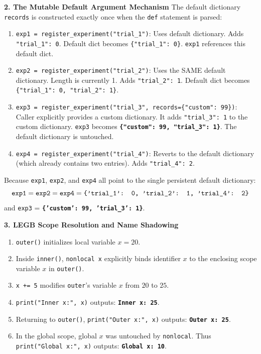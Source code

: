 \textbf{2. The Mutable Default Argument Mechanism}
The default dictionary \texttt{records} is constructed exactly once when the \texttt{def} statement is parsed:
\begin{enumerate}
    \item \texttt{exp1 = register\_experiment("trial\_1")}: Uses default dictionary. Adds \texttt{"trial\_1": 0}. Default dict becomes \texttt{\{"trial\_1": 0\}}. \texttt{exp1} references this default dict.
    \item \texttt{exp2 = register\_experiment("trial\_2")}: Uses the SAME default dictionary. Length is currently 1. Adds \texttt{"trial\_2": 1}. Default dict becomes \texttt{\{"trial\_1": 0, "trial\_2": 1\}}.
    \item \texttt{exp3 = register\_experiment("trial\_3", records=\{"custom": 99\})}: Caller explicitly provides a custom dictionary. It adds \texttt{"trial\_3": 1} to the custom dictionary. \texttt{exp3} becomes \textbf{\texttt{\{"custom": 99, "trial\_3": 1\}}}. The default dictionary is untouched.
    \item \texttt{exp4 = register\_experiment("trial\_4")}: Reverts to the default dictionary (which already contains two entries). Adds \texttt{"trial\_4": 2}.
\end{enumerate}
Because \texttt{exp1}, \texttt{exp2}, and \texttt{exp4} all point to the single persistent default dictionary:
\begin{equation*}
\text{\texttt{exp1}} = \text{\texttt{exp2}} = \text{\texttt{exp4}} = \mathbf{\texttt{\{'trial\_1': 0, 'trial\_2': 1, 'trial\_4': 2\}}}
\end{equation*}
and \texttt{exp3} = \textbf{\texttt{\{'custom': 99, 'trial\_3': 1\}}}.

\textbf{3. LEGB Scope Resolution and Name Shadowing}
\begin{enumerate}
    \item \texttt{outer()} initializes local variable $x = 20$.
    \item Inside \texttt{inner()}, \texttt{nonlocal x} explicitly binds identifier $x$ to the enclosing scope variable $x$ in \texttt{outer()}.
    \item \texttt{x += 5} modifies \texttt{outer}'s variable $x$ from $20$ to $25$.
    \item \texttt{print("Inner x:", x)} outputs: \textbf{\texttt{Inner x: 25}}.
    \item Returning to \texttt{outer()}, \texttt{print("Outer x:", x)} outputs: \textbf{\texttt{Outer x: 25}}.
    \item In the global scope, global $x$ was untouched by \texttt{nonlocal}. Thus \texttt{print("Global x:", x)} outputs: \textbf{\texttt{Global x: 10}}.
\end{enumerate}

